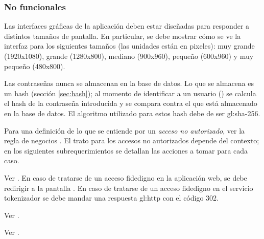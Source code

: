 %
%

\subsubsection{No funcionales}

{
  Las interfaces gráficas de la aplicación deben estar diseñadas para
  responder a distintos tamaños de pantalla. En particular, se debe
  mostrar cómo se ve la interfaz para los siguientes tamaños (las unidades están
  en pixeles): muy grande (1920x1080), grande (1280x800), mediano (900x960),
  pequeño (600x960) y muy pequeño (480x800).
}

{
  Las contraseñas nunca se almacenan en la base de datos. Lo que se almacena es
  un hash (sección \ref{sec:hash}); al momento de identificar a un usuario
  () se calcula el hash de la
  contraseña introducida y se compara contra el que está almacenado en la base
  de datos. El algoritmo utilizado para estos hash debe de ser \gls{gl:sha}-256.
}

{
  Para una definición de lo que se entiende por un \textit{acceso no
  autorizado}, ver la regla de negocios .
  El trato para los accesos no autorizados depende del contexto; en los
  siguientes subrequerimientos se detallan las acciones a tomar para cada caso.

  {
    Ver . En caso de tratarse de un acceso
    fidedigno en la aplicación web, se debe redirigir a la pantalla
    . En caso de tratarse de un acceso fidedigno
    en el servicio tokenizador se debe mandar una respuesta \gls{gl:http} con el
    código 302.
  }

  {
    Ver .
  }

  {
    Ver .
  }
}
